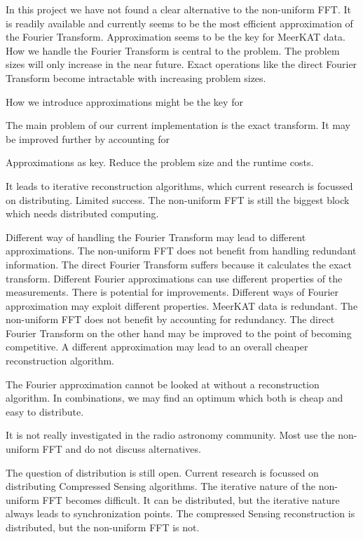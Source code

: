 In this project we have not found a clear alternative to the non-uniform FFT. It is readily available\cite{kunisnonequispaced, offringa2014wsclean} and currently seems to be the most efficient approximation of the Fourier Transform.
Approximation seems to be the key for MeerKAT data. How we handle the Fourier Transform is central to the problem.
 The problem sizes will only increase in the near future. Exact operations like the direct Fourier Transform become intractable with increasing problem sizes.

How we introduce approximations might be the key for 


The main problem of our current implementation is the exact transform. It may be improved further by accounting for 

Approximations as key. Reduce the problem size and the runtime costs. 


It leads to iterative reconstruction algorithms, which current research is focussed on distributing\cite{dabbech2018cygnus, pratley2018fast}.
Limited success. The non-uniform FFT is still the biggest block which needs distributed computing.



Different way of handling the Fourier Transform may lead to different approximations. The non-uniform FFT does not benefit from handling redundant information.
The direct Fourier Transform suffers because it calculates the exact transform.
Different Fourier approximations can use different properties of the measurements.
There is potential for improvements. Different ways of Fourier approximation may exploit different properties. MeerKAT data is redundant. The non-uniform FFT does not benefit by accounting for redundancy. The direct Fourier Transform on the other hand may be improved to the point of becoming competitive. A different approximation may lead to an overall cheaper reconstruction algorithm.

The Fourier approximation cannot be looked at without a reconstruction algorithm. In combinations, we may find an optimum which both is cheap and easy to distribute.

It is not really investigated in the radio astronomy community. Most use the non-uniform FFT and do not discuss alternatives. 

The question of distribution is still open. Current research is focussed on distributing Compressed Sensing algorithms\cite{dabbech2018cygnus, pratley2018fast}. The iterative nature of the non-uniform FFT becomes difficult. It can be distributed\cite{kunisnonequispaced}, but the iterative nature always leads to synchronization points. The compressed Sensing reconstruction is distributed, but the non-uniform FFT is not.
 




